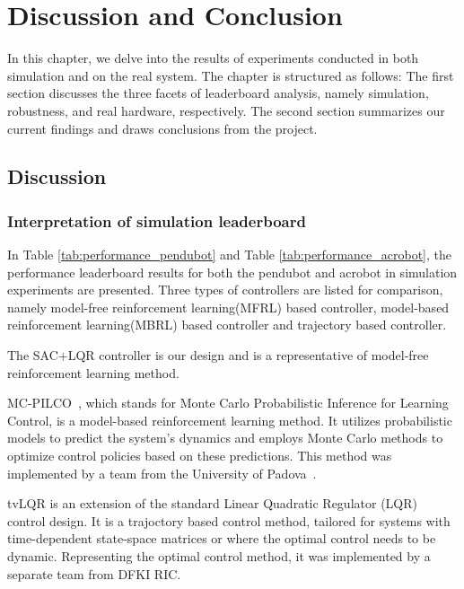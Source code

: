 \chapter{Discussion and Conclusion}
In this chapter, we delve into the results of experiments conducted in both simulation and on the real system. The chapter is structured as follows: The first section discusses the three facets of leaderboard analysis, namely simulation, robustness, and real hardware, respectively. The second section summarizes our current findings and draws conclusions from the project.

\section{Discussion}
\subsection{Interpretation of simulation leaderboard}
In Table \ref{tab:performance_pendubot} and Table \ref{tab:performance_acrobot}, the performance leaderboard results for both the pendubot and acrobot in simulation experiments are presented. Three types of controllers are listed for comparison, namely model-free reinforcement learning(MFRL) based controller, model-based reinforcement learning(MBRL) based controller and trajectory based controller.

The SAC+LQR controller is our design and is a representative of model-free reinforcement learning method. 

MC-PILCO~\cite{amadio2022model}, which stands for Monte Carlo Probabilistic Inference for Learning Control, is a model-based reinforcement learning method. It utilizes probabilistic models to predict the system's dynamics and employs Monte Carlo methods to optimize control policies based on these predictions. This method was implemented by a team from the University of Padova~\cite{Libera2023AthleticIO}. 

tvLQR is an extension of the standard Linear Quadratic Regulator (LQR) control design. It is a trajoctory based control method, tailored for systems with time-dependent state-space matrices or where the optimal control needs to be dynamic. Representing the optimal control method, it was implemented by a separate team from DFKI RIC\cite{2023_ram_wiebe_double_pendulum}.

